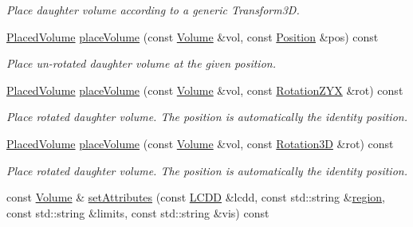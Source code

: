 \begin{DoxyCompactItemize}
\begin{DoxyCompactList}\small\item\em Place daughter volume according to a generic Transform3D. \end{DoxyCompactList}\item 
\hyperlink{class_d_d4hep_1_1_geometry_1_1_placed_volume}{Placed\+Volume} \hyperlink{class_d_d4hep_1_1_geometry_1_1_volume_a4d2fa28ba60221a280fb4dfb3eae0f01}{place\+Volume} (const \hyperlink{class_d_d4hep_1_1_geometry_1_1_volume}{Volume} \&vol, const \hyperlink{namespace_d_d4hep_1_1_geometry_a55083902099d03506c6db01b80404900}{Position} \&pos) const
\begin{DoxyCompactList}\small\item\em Place un-\/rotated daughter volume at the given position. \end{DoxyCompactList}\item 
\hyperlink{class_d_d4hep_1_1_geometry_1_1_placed_volume}{Placed\+Volume} \hyperlink{class_d_d4hep_1_1_geometry_1_1_volume_ad7536b9cb994732af231729f5ab75ce5}{place\+Volume} (const \hyperlink{class_d_d4hep_1_1_geometry_1_1_volume}{Volume} \&vol, const \hyperlink{namespace_d_d4hep_1_1_geometry_a24667b2b9c3cec3d5239828db4d52189}{Rotation\+Z\+YX} \&rot) const
\begin{DoxyCompactList}\small\item\em Place rotated daughter volume. The position is automatically the identity position. \end{DoxyCompactList}\item 
\hyperlink{class_d_d4hep_1_1_geometry_1_1_placed_volume}{Placed\+Volume} \hyperlink{class_d_d4hep_1_1_geometry_1_1_volume_ae76792f42c90e5821c7cd3e2b2d70f0e}{place\+Volume} (const \hyperlink{class_d_d4hep_1_1_geometry_1_1_volume}{Volume} \&vol, const \hyperlink{namespace_d_d4hep_1_1_geometry_a022fecb763315fa2bf39cbb648944a0e}{Rotation3D} \&rot) const
\begin{DoxyCompactList}\small\item\em Place rotated daughter volume. The position is automatically the identity position. \end{DoxyCompactList}\item 
const \hyperlink{class_d_d4hep_1_1_geometry_1_1_volume}{Volume} \& \hyperlink{class_d_d4hep_1_1_geometry_1_1_volume_a941f3319c6a0014bd8da831c0a4580aa}{set\+Attributes} (const \hyperlink{class_d_d4hep_1_1_geometry_1_1_l_c_d_d}{L\+C\+DD} \&lcdd, const std\+::string \&\hyperlink{class_d_d4hep_1_1_geometry_1_1_volume_a5fda2a86ec792e7fe38d7e63b0c939e8}{region}, const std\+::string \&limits, const std\+::string \&vis) const

\end{DoxyCompactItemize}
